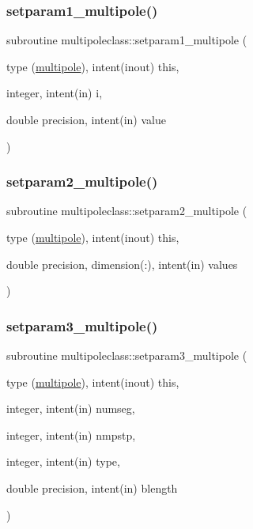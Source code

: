 \subsubsection{\texorpdfstring{setparam1\_multipole()}{setparam1\_multipole()}}
{\footnotesize\ttfamily subroutine multipoleclass\+::setparam1\+\_\+multipole (\begin{DoxyParamCaption}\item[{type (\mbox{\hyperlink{namespacemultipoleclass_structmultipoleclass_1_1multipole}{multipole}}), intent(inout)}]{this,  }\item[{integer, intent(in)}]{i,  }\item[{double precision, intent(in)}]{value }\end{DoxyParamCaption})}

\mbox{\label{namespacemultipoleclass_ac9e1b3b044ae69816a92317bcfd1bc05}} 
\subsubsection{\texorpdfstring{setparam2\_multipole()}{setparam2\_multipole()}}
{\footnotesize\ttfamily subroutine multipoleclass\+::setparam2\+\_\+multipole (\begin{DoxyParamCaption}\item[{type (\mbox{\hyperlink{namespacemultipoleclass_structmultipoleclass_1_1multipole}{multipole}}), intent(inout)}]{this,  }\item[{double precision, dimension(\+:), intent(in)}]{values }\end{DoxyParamCaption})}

\mbox{\label{namespacemultipoleclass_ad752ec84fa7145abc1b9130eb8654867}} 
\subsubsection{\texorpdfstring{setparam3\_multipole()}{setparam3\_multipole()}}
{\footnotesize\ttfamily subroutine multipoleclass\+::setparam3\+\_\+multipole (\begin{DoxyParamCaption}\item[{type (\mbox{\hyperlink{namespacemultipoleclass_structmultipoleclass_1_1multipole}{multipole}}), intent(inout)}]{this,  }\item[{integer, intent(in)}]{numseg,  }\item[{integer, intent(in)}]{nmpstp,  }\item[{integer, intent(in)}]{type,  }\item[{double precision, intent(in)}]{blength }\end{DoxyParamCaption})}



